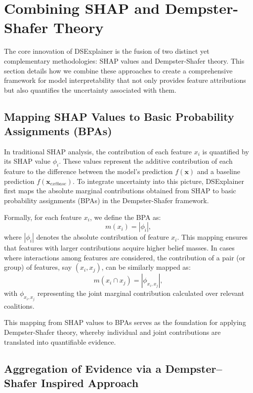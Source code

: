 \documentclass[acmlarge]{acmart}
\begin{document}
\section{Combining SHAP and Dempster-Shafer Theory}
\label{sec:combining}

The core innovation of DSExplainer is the fusion of two distinct yet complementary methodologies: SHAP values and Dempster-Shafer theory. This section details how we combine these approaches to create a comprehensive framework for model interpretability that not only provides feature attributions but also quantifies the uncertainty associated with them.

\subsection{Mapping SHAP Values to Basic Probability Assignments (BPAs)}

In traditional SHAP analysis, the contribution of each feature \( x_i \) is quantified by its SHAP value \( \phi_i \). These values represent the additive contribution of each feature to the difference between the model's prediction \( f(\mathbf{x}) \) and a baseline prediction \( f(\mathbf{x}_{ext{base}}) \). To integrate uncertainty into this picture, DSExplainer first maps the absolute marginal contributions obtained from SHAP to basic probability assignments (BPAs) in the Dempster-Shafer framework.

Formally, for each feature \( x_i \), we define the BPA as:
\[
m(x_i) = |\phi_i|,
\]
where \( |\phi_i| \) denotes the absolute contribution of feature \( x_i \). This mapping ensures that features with larger contributions acquire higher belief masses. In cases where interactions among features are considered, the contribution of a pair (or group) of features, say \( (x_i, x_j) \), can be similarly mapped as:
\[
m(x_i \cap x_j) = |\phi_{x_i, x_j}|,
\]
with \( \phi_{x_i, x_j} \) representing the joint marginal contribution calculated over relevant coalitions.

This mapping from SHAP values to BPAs serves as the foundation for applying Dempster-Shafer theory, whereby individual and joint contributions are translated into quantifiable evidence.

\subsection{Aggregation of Evidence via a Dempster--Shafer Inspired Approach}
\end{document}
